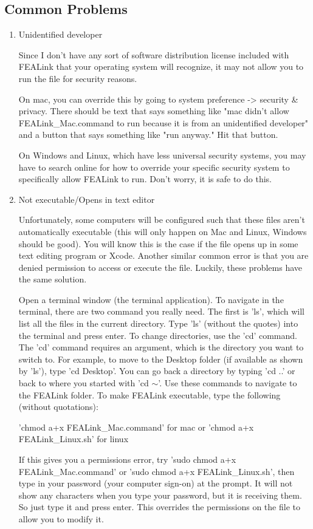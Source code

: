\documentclass[11pt, oneside]{article}   	%
\begin{document}
\subsection{Common Problems} \label{Common Problems}
\begin{enumerate}
	\item{Unidentified developer}

Since I don't have any sort of software distribution license included with FEALink that your operating system will recognize, it may not allow you to run the file for security reasons.  

On mac, you can override this by going to system preference -> security \& privacy.  There should be text that says something like "mac didn't allow FEALink\_Mac.command to run because it is from an unidentified developer" and a button that says something like "run anyway."  Hit that button.

On Windows and Linux, which have less universal security systems, you may have to search online for how to override your specific security system to specifically allow FEALink to run.  Don't worry, it is safe to do this.

	\item{Not executable/Opens in text editor}

Unfortunately, some computers will be configured such that these files aren't automatically executable (this will only happen on Mac and Linux, Windows should be good).  You will know this is the case if the file opens up in some text editing program or Xcode.  Another similar common error is that you are denied permission to access or execute the file.  Luckily, these problems have the same solution.  

Open a terminal window (the terminal application).  To navigate in the terminal, there are two command you really need.  The first is 'ls', which will list all the files in the current directory.  Type 'ls' (without the quotes) into the terminal and press enter.  To change directories, use the 'cd' command.  The 'cd' command requires an argument, which is the directory you want to switch to.  For example, to move to the Desktop folder (if available as shown by 'ls'), type 'cd Desktop'.  You can go back a directory by typing 'cd ..' or back to where you started with 'cd $\sim$'.  Use these commands to navigate to the FEALink folder.  To make FEALink executable, type the following (without quotations):

'chmod a+x FEALink\_Mac.command' for mac or 'chmod a+x FEALink\_Linux.sh' for linux

If this gives you a permissions error, try 'sudo chmod a+x FEALink\_Mac.command' or 'sudo chmod a+x FEALink\_Linux.sh', then type in your password (your computer sign-on) at the prompt.  It will not show any characters when you type your password, but it is receiving them.  So just type it and press enter.  This overrides the permissions on the file to allow you to modify it.

\end{enumerate}
\end{document}
